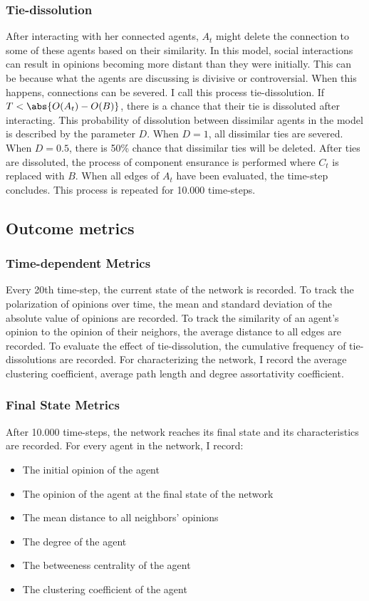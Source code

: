 \documentclass{article}
\DeclarePairedDelimiter{\abs}\lvert\rvert
\begin{document}
\subsubsection{Tie-dissolution}
After interacting with her connected agents, $A_t$ might delete the connection to some of these agents based on their similarity.
In this model, social interactions can result in opinions becoming more distant than they were initially. 
This can be because what the agents are discussing is divisive or controversial. When this happens, connections can be severed.
I call this process tie-dissolution. 
If $T < \abs{O(A_t) - O(B)}$, there is a chance that their tie is dissoluted after interacting. This probability of dissolution between dissimilar agents in the model is described by the parameter $D$.
When $D = 1$, all dissimilar ties are severed. When $D = 0.5$, there is 50\% chance that dissimilar ties will be deleted. 
After ties are dissoluted, the process of component ensurance is performed where $C_t$ is replaced with $B$.
When all edges of $A_t$ have been evaluated, the time-step concludes. This process is repeated for 10.000 time-steps.

\subsection{Outcome metrics} 

\subsubsection{Time-dependent Metrics}
Every 20th time-step, the current state of the network is recorded. 
To track the polarization of opinions over time,
the mean and standard deviation of the absolute value of opinions are recorded.
To track the similarity of an agent's opinion to the opinion of their neighors, the average distance to all edges are recorded.
To evaluate the effect of tie-dissolution, the cumulative frequency of tie-dissolutions are recorded.
For characterizing the network, I record the average clustering coefficient, average path length and degree assortativity coefficient.

\subsubsection{Final State Metrics}
After 10.000 time-steps, the network reaches its final state and its characteristics are recorded. 
For every agent in the network, I record: 
\begin{itemize}
    \item The initial opinion of the agent
    \item The opinion of the agent at the final state of the network
    \item The mean distance to all neighbors' opinions
    \item The degree of the agent 
    \item The betweeness centrality of the agent 
    \item The clustering coefficient of the agent 
\end{itemize}
\end{document}
